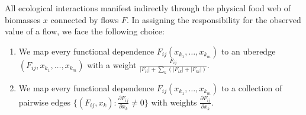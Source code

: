 \documentclass[a4paper,12pt]{article}
\theoremstyle{definition}
\theoremstyle{remark}
\begin{document}
All ecological interactions manifest indirectly through the physical food web of biomasses $x$ connected by flows $F$. In assigning the responsibility for the observed value of a flow, we face the following choice:
\begin{enumerate}
    \item We map every functional dependence $F_{ij}(x_{k_1}, \ldots, x_{k_m})$ to an uberedge $(F_{ij}, x_{k_1}, \ldots, x_{k_m})$ with a weight $\tfrac{F_{ij}}{|F_{ii}|+\sum_{k}(|F_{ik}|+|F_{ki}|)}$.
    \item We map every functional dependence $F_{ij}(x_{k_1}, \ldots, x_{k_m})$ to a collection of pairwise edges $\{(F_{ij}, x_{k}): \tfrac{\partial F_{ij}}{\partial x_k}\neq 0\}$ with weights $\tfrac{\partial F_{ij}}{\partial x_k}$.
\end{enumerate}







 
	
\end{document}
